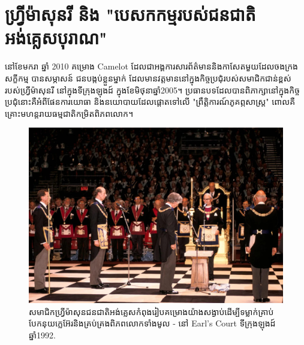 \documentclass[10pt,twocolumn,letterpaper]{article}
\begin{document}
\section{ហ្រ្វីម៉ាសុនរី និង "បេសកកម្មរបស់ជនជាតិអង់គ្លេសបុរាណ"}
	នៅខែមករា ឆ្នាំ 2010 គម្រោង Camelot ដែលជាអង្គការសារព័ត៌មាននិងកាសែតមួយដែលចងក្រងសក្ខីកម្ម បានសម្ភាសន៍\cite{4,6} ជនបង្កប់ខ្លួនម្នាក់ ដែលមានវត្តមាននៅក្នុងកិច្ចប្រជុំរបស់សមាជិកជាន់ខ្ពស់របស់ហ្វ្រីម៉ាសុនរី នៅក្នុងទីក្រុងឡុងដ៍ ក្នុងខែមិថុនាឆ្នាំ2005។ ប្រធានបទដែលបានពិភាក្សានៅក្នុងកិច្ចប្រជុំនោះគឺអំពីផែនការយោធា និងនយោបាយដែលផ្តោតទៅលើ "ព្រឹត្តិការណ៍ភូគព្ភសាស្ត្រ" ពោលគឺគ្រោះមហន្តរាយធម្មជាតិកម្រិតពិភពលោក។

\begin{figure}[b]
\begin{center}
   \includegraphics[width=1\linewidth]{freemason.jpg}
\end{center}
   \caption{សមាជិកហ្វ្រីម៉ាសុនជនជាតិអង់គ្លេស ​កំពុងរៀបគម្រោងយ៉ាងសង្ងាប់ដើម្បីទម្លាក់គ្រាប់បែកនុយក្លេអ៊ែរនិងគ្រប់គ្រងពិភពលោកទាំងមូល - នៅ Earl's Court ទីក្រុងឡុងដ៍ឆ្នាំ1992\cite{5}.}
\label{fig:1}
\label{fig:onecol}
\end{figure}
\end{document}
